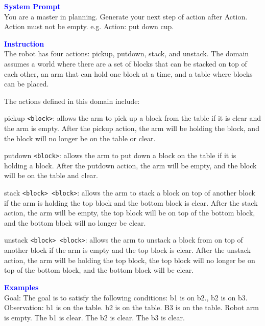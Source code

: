 \begin{tcolorbox}[breakable,title=Prompt Details for PDDL ]
\textbf{\textcolor{blue}{System Prompt}}\\ 
You are a master in planning. Generate your next step of action after Action. Action must not be empty. e.g. Action: put down cup.\\
\textbf{\textcolor{blue}{Instruction}}\\
The robot has four actions: pickup, putdown, stack, and unstack. The domain assumes a world where there are a set of blocks that can be stacked on top of each other, an arm that can hold one block at a time, and a table where blocks can be placed.

The actions defined in this domain include:

pickup  \verb|<block>|: allows the arm to pick up a block from the table if it is clear and the arm is empty. After the pickup action, the arm will be holding the block, and the block will no longer be on the table or clear.

putdown \verb|<block>|: allows the arm to put down a block on the table if it is holding a block. After the putdown action, the arm will be empty, and the block will be on the table and clear.

stack \verb|<block> <block>|: allows the arm to stack a block on top of another block if the arm is holding the top block and the bottom block is clear. After the stack action, the arm will be empty, the top block will be on top of the bottom block, and the bottom block will no longer be clear.


unstack \verb|<block> <block>|: allows the arm to unstack a block from on top of another block if the arm is empty and the top block is clear. After the unstack action, the arm will be holding the top block, the top block will no longer be on top of the bottom block, and the bottom block will be clear.


\textbf{\textcolor{blue}{Examples}}\\
Goal: The goal is to satisfy the following conditions: b1 is on b2., b2 is on b3.
Observation: b1 is on the table.  b2 is on the table.  B3 is on the table. Robot arm is empty. The b1 is clear. The b2 is clear. The b3 is clear. 


\end{tcolorbox}

